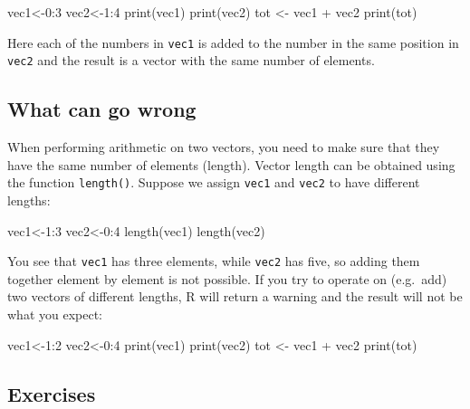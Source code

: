 \documentclass[
  letterpaper,
  DIV=11,
  numbers=noendperiod]{scrreprt}
\newenvironment{Shaded}{\begin{snugshade}}{\end{snugshade}}
\newcommand{\NormalTok}[1]{\textcolor[rgb]{0.00,0.23,0.31}{#1}}
\begin{document}
\begin{Shaded}
\begin{Highlighting}[]
\NormalTok{vec1\textless{}{-}0:3}
\NormalTok{vec2\textless{}{-}1:4}
\NormalTok{print(vec1)}
\NormalTok{print(vec2)}
\NormalTok{tot \textless{}{-} vec1 + vec2}
\NormalTok{print(tot)}
\end{Highlighting}
\end{Shaded}

Here each of the numbers in \texttt{vec1} is added to the number in the
same position in \texttt{vec2} and the result is a vector with the same
number of elements.

\hypertarget{what-can-go-wrong-2}{%
\subsection*{What can go wrong}\label{what-can-go-wrong-2}}

When performing arithmetic on two vectors, you need to make sure that
they have the same number of elements (length). Vector length can be
obtained using the function \texttt{length()}. Suppose we assign
\texttt{vec1} and \texttt{vec2} to have different lengths:

\begin{Shaded}
\begin{Highlighting}[]
\NormalTok{vec1\textless{}{-}1:3}
\NormalTok{vec2\textless{}{-}0:4}
\NormalTok{length(vec1)}
\NormalTok{length(vec2)}
\end{Highlighting}
\end{Shaded}

You see that \texttt{vec1} has three elements, while \texttt{vec2} has
five, so adding them together element by element is not possible. If you
try to operate on (e.g.~add) two vectors of different lengths, R will
return a warning and the result will not be what you expect:

\begin{Shaded}
\begin{Highlighting}[]
\NormalTok{vec1\textless{}{-}1:2}
\NormalTok{vec2\textless{}{-}0:4}
\NormalTok{print(vec1)}
\NormalTok{print(vec2)}
\NormalTok{tot \textless{}{-} vec1 + vec2}
\NormalTok{print(tot)}
\end{Highlighting}
\end{Shaded}

\hypertarget{exercises-5}{%
\subsection*{Exercises}\label{exercises-5}}
\end{document}
